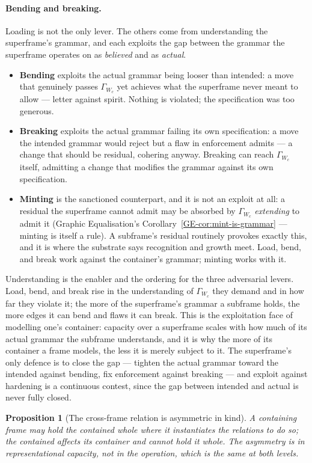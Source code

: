 \documentclass[11pt,a4paper]{article}
\newtheorem{proposition}[definition]{Proposition}
\theoremstyle{remark}
\begin{document}
\paragraph{Bending and breaking.} Loading is not the only lever. The others come from understanding the superframe's grammar, and each exploits the gap between the grammar the superframe operates on as \emph{believed} and as \emph{actual}.
\begin{itemize}[leftmargin=*]
\item \textbf{Bending} exploits the actual grammar being looser than intended: a move that genuinely passes $\Gamma_{W_c}$ yet achieves what the superframe never meant to allow --- letter against spirit. Nothing is violated; the specification was too generous.
\item \textbf{Breaking} exploits the actual grammar failing its own specification: a move the intended grammar would reject but a flaw in enforcement admits --- a change that should be residual, cohering anyway. Breaking can reach $\Gamma_{W_c}$ itself, admitting a change that modifies the grammar against its own specification.
\item \textbf{Minting} is the sanctioned counterpart, and it is not an exploit at all: a residual the superframe cannot admit may be absorbed by $\Gamma_{W_c}$ \emph{extending} to admit it (Graphic Equalisation's Corollary~\ref{GE-cor:mint-is-grammar} --- minting is itself a rule). A subframe's residual routinely provokes exactly this, and it is where the substrate says recognition and growth meet. Load, bend, and break work against the container's grammar; minting works with it.
\end{itemize}
Understanding is the enabler and the ordering for the three adversarial levers. Load, bend, and break rise in the understanding of $\Gamma_{W_c}$ they demand and in how far they violate it; the more of the superframe's grammar a subframe holds, the more edges it can bend and flaws it can break. This is the exploitation face of modelling one's container: capacity over a superframe scales with how much of its actual grammar the subframe understands, and it is why the more of its container a frame models, the less it is merely subject to it. The superframe's only defence is to close the gap --- tighten the actual grammar toward the intended against bending, fix enforcement against breaking --- and exploit against hardening is a continuous contest, since the gap between intended and actual is never fully closed.

\begin{proposition}[The cross-frame relation is asymmetric in kind]\label{prop:cross-frame-asymmetry}
A containing frame \emph{may} hold the contained whole where it instantiates the relations to do so; the contained affects its container and cannot hold it whole. The asymmetry is in representational \emph{capacity}, not in the operation, which is the same at both levels.
\end{proposition}
\end{document}
